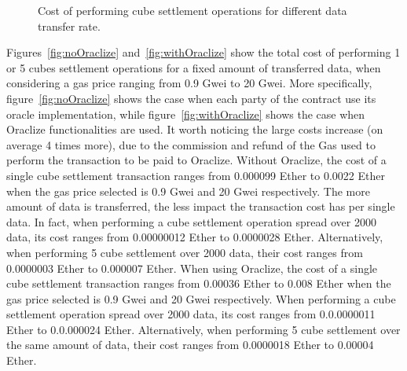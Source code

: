 \begin{figure}[t]
	\centering
	\caption{Cost of performing cube settlement operations for different data transfer rate.}
	\label{fig:all}
\end{figure}

Figures~\ref{fig:noOraclize} and~\ref{fig:withOraclize} show the total cost of performing 1 or 5 cubes settlement operations for a fixed amount of transferred data, when considering a gas price ranging from 0.9 Gwei to 20 Gwei.
More specifically, figure~\ref{fig:noOraclize} shows the case when each party of the contract use its oracle implementation, while figure~\ref{fig:withOraclize} shows the case when Oraclize functionalities are used. 
It worth noticing the large costs increase (on average 4 times more), due to the commission and refund of the Gas used to perform the transaction to be paid to Oraclize. 
Without Oraclize, the cost of a single cube settlement transaction ranges from 0.000099 Ether to 0.0022 Ether when the gas price selected is 0.9 Gwei and 20 Gwei respectively. The more amount of data is transferred, the less impact the transaction cost has per single data. In fact, when performing a cube settlement operation spread over 2000 data, its cost ranges from 0.00000012 Ether to 0.0000028 Ether. Alternatively, when performing 5 cube settlement over 2000 data, their cost ranges from 0.0000003 Ether to 0.000007 Ether.
When using Oraclize, the cost of a single cube settlement transaction ranges from 0.00036 Ether to 0.008 Ether when the gas price selected is 0.9 Gwei and 20 Gwei respectively. When performing a cube settlement operation spread over 2000 data, its cost ranges from 0.0.0000011 Ether to 0.0.000024 Ether. Alternatively, when performing 5 cube settlement over the same amount of data, their cost ranges from 0.0000018 Ether to 0.00004 Ether.

